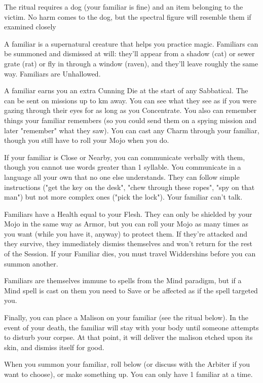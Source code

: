 {The ritual requires a dog (your familiar is fine) and an item belonging to the victim.  No harm comes to the dog, but the spectral figure will resemble them if examined closely


\OCCULT[
  Name=Bind Familiar,
  Link=occultism-bind-familiar,
  Success=1,
  Cost=666,
  Widdershins=1
]


A familiar is a supernatural creature that helps you practice magic.  Familiars can be summoned and dismissed at will: they'll appear from a shadow (cat) or sewer grate (rat) or fly in through a window (raven), and they'll leave roughly the same way.  Familiars are Unhallowed.

A familiar earns you an extra Cunning Die at the start of any Sabbatical.  The can be sent on missions up to \LVL km away.  You can see what they see as if you were gazing through their eyes for as long as you Concentrate. You also can remember things your familiar remembers (so you could send them on a spying mission and later "remember" what they saw). You can cast any Charm through your familiar, though you still have to roll your Mojo when you do.  

If your familiar is Close or Nearby, you can communicate verbally with them, though you cannot use words greater than 1 syllable.  You communicate in a language all your own that no one else understands.  They can follow simple instructions ("get the key on the desk", "chew through these ropes", "spy on that man") but not more complex ones ("pick the lock").  Your familiar can't talk.

Familiars have a Health equal to your Flesh.  They can only be shielded by your Mojo in the same way as Armor, but you can roll your Mojo as many times as you want (while you have it, anyway) to protect them.  If they're attacked and they survive, they immediately dismiss themselves and won't return for the rest of the Session. If your Familiar dies, you must travel Widdershins before you can summon another.  

Familiars are themselves immune to spells from the Mind paradigm, but if a Mind spell is cast on them you need to Save or be affected as if the spell targeted you.

Finally,  you can place a Malison on your familiar (see the ritual below).  In the event of your death, the familiar will stay with your body until someone attempts to disturb your corpse.  At that point, it will deliver the malison etched upon its skin, and dismiss itself for good.

When you summon your familiar, roll below (or discuss with the Arbiter if you want to choose), or make something up.  You can only have 1 familiar at a time.



}
